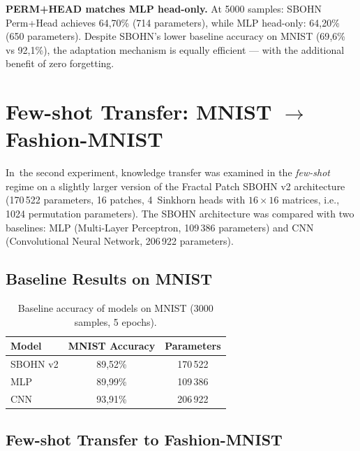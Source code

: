 \documentclass[11pt,a4paper]{report}
\begin{document}
\textbf{PERM+HEAD matches MLP head-only.} At 5000 samples: SBOHN Perm+Head achieves 64{,}70\% (714 parameters), while MLP head-only: 64{,}20\% (650 parameters). Despite SBOHN's lower baseline accuracy on MNIST (69{,}6\% vs 92{,}1\%), the adaptation mechanism is equally efficient --- with the additional benefit of zero forgetting.


\section{Few-shot Transfer: MNIST $\to$ Fashion-MNIST}
\label{sec:fewshot}


In~the second experiment, knowledge transfer was examined in the \emph{few-shot} regime on a slightly larger version of the Fractal Patch SBOHN v2 architecture (170\,522 parameters, 16 patches, 4~Sinkhorn heads with $16 \times 16$ matrices, i.e., 1024 permutation parameters). The SBOHN architecture was compared with two baselines: MLP (Multi-Layer Perceptron, 109\,386 parameters) and CNN (Convolutional Neural Network, 206\,922 parameters).

\subsection{Baseline Results on MNIST}

\begin{table}[htbp]
\centering
\caption{Baseline accuracy of models on MNIST (3000 samples, 5 epochs).}
\label{tab:fewshot_base}
\begin{tabular}{l|c|c}
\hline
\textbf{Model} & \textbf{MNIST Accuracy} & \textbf{Parameters} \\
\hline
SBOHN v2 & 89{,}52\% & 170\,522 \\
MLP      & 89{,}99\% & 109\,386 \\
CNN      & 93{,}91\% & 206\,922 \\
\hline
\end{tabular}
\end{table}

\subsection{Few-shot Transfer to Fashion-MNIST}
\end{document}

